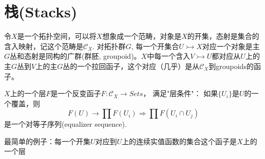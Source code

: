 \section{栈(Stacks)}
令$X$是一个拓扑空间，可以将$X$想象成一个范畴，对象是$X$的开集，态射是集合的含入映射，记这个范畴是$\mathcal{C}_X$. 对拓扑群$G$,  每一个开集合$U\rightarrowtail X$对应一个对象是主$G$丛和态射是同构的广群(群胚, groupoid)。$X$中每一个含入$V\rightarrowtail U$都对应从$U$上的主$G$丛到$V$上的主$G$丛的一个拉回函子，这个对应（几乎）是从$\mathcal{C}_X$到groupoids的函子。

\begin{definition}
	$X$上的一个层$F$是一个反变函子$F\colon \mathcal{C}_X \longrightarrow Sets$， 满足"层条件"：
	 如果$\{U_i\}$是$U$的一个覆盖，则
	 \[F(U)\longrightarrow \prod F(U_i) \Longrightarrow \prod F(U_i\cap U_j)\]
	 是一个对等子序列(equalizer sequence).
\end{definition}
最简单的例子：每一个开集$U$对应到$U$上的连续实值函数的集合这个函子是$X$上的一个层